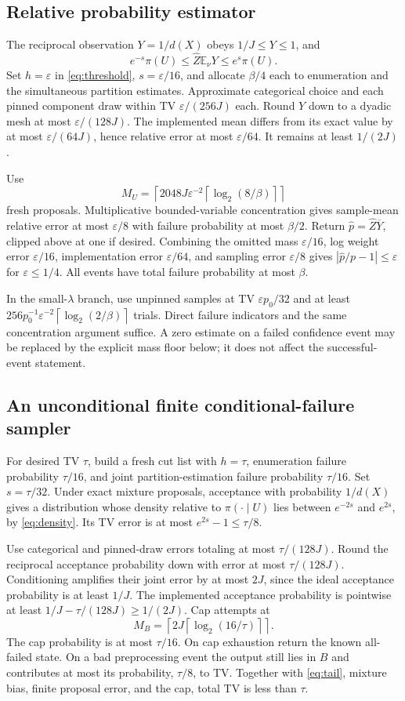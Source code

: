 \documentclass[11pt]{article}
\newcommand{\E}{\mathbb E}
\newcommand{\ceil}[1]{\left\lceil #1\right\rceil}
\newcommand{\eps}{\varepsilon}
\begin{document}
\subsection{Relative probability estimator}
The reciprocal observation $Y=1/d(X)$ obeys $1/J\le Y\le1$, and
\begin{equation}
 e^{-s}\pi(U)\le\widehat Z\E_\nu Y\le e^s\pi(U).
 \label{eq:unionmean}
\end{equation}
Set $h=\eps$ in \eqref{eq:threshold}, $s=\eps/16$, and allocate $\beta/4$ each to enumeration and the simultaneous partition estimates. Approximate categorical choice and each pinned component draw within TV $\eps/(256J)$ each. Round $Y$ down to a dyadic mesh at most $\eps/(128J)$. The implemented mean differs from its exact value by at most $\eps/(64J)$, hence relative error at most $\eps/64$. It remains at least $1/(2J)$.

Use
\[
 M_U=\ceil{2048J\eps^{-2}\ceil{\log_2(8/\beta)}}
\]
fresh proposals. Multiplicative bounded-variable concentration gives sample-mean relative error at most $\eps/8$ with failure probability at most $\beta/2$. Return $\widehat p=\widehat Z\overline Y$, clipped above at one if desired. Combining the omitted mass $\eps/16$, log weight error $\eps/16$, implementation error $\eps/64$, and sampling error $\eps/8$ gives $|\widehat p/p-1|\le\eps$ for $\eps\le1/4$. All events have total failure probability at most $\beta$.

In the small-$\lambda$ branch, use unpinned samples at TV $\eps p_0/32$ and at least $256p_0^{-1}\eps^{-2}\ceil{\log_2(2/\beta)}$ trials. Direct failure indicators and the same concentration argument suffice. A zero estimate on a failed confidence event may be replaced by the explicit mass floor below; it does not affect the successful-event statement.

\subsection{An unconditional finite conditional-failure sampler}
For desired TV $\tau$, build a fresh cut list with $h=\tau$, enumeration failure probability $\tau/16$, and joint partition-estimation failure probability $\tau/16$. Set $s=\tau/32$. Under exact mixture proposals, acceptance with probability $1/d(X)$ gives a distribution whose density relative to $\pi(\cdot\mid U)$ lies between $e^{-2s}$ and $e^{2s}$, by \eqref{eq:density}. Its TV error is at most $e^{2s}-1\le\tau/8$.

Use categorical and pinned-draw errors totaling at most $\tau/(128J)$. Round the reciprocal acceptance probability down with error at most $\tau/(128J)$. Conditioning amplifies their joint error by at most $2J$, since the ideal acceptance probability is at least $1/J$. The implemented acceptance probability is pointwise at least $1/J-\tau/(128J)\ge1/(2J)$. Cap attempts at
\[
 M_B=\ceil{2J\ceil{\log_2(16/\tau)}}.
\]
The cap probability is at most $\tau/16$. On cap exhaustion return the known all-failed state. On a bad preprocessing event the output still lies in $B$ and contributes at most its probability, $\tau/8$, to TV. Together with \eqref{eq:tail}, mixture bias, finite proposal error, and the cap, total TV is less than $\tau$.
\end{document}
